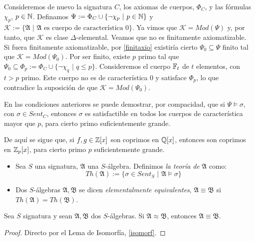 \begin{example}
Consideremos de nuevo la signatura $C$, los axiomas de cuerpos, $\Phi_C$, y las fórmulas $\chi_p$, $p \in \mathbb{N}$. Definamos $\Psi := \Phi_C \cup \{\neg\chi_p \, \, | \, \, p\in \mathbb{N} \}$ y $\mathcal{K} :=\{\mathfrak{A} \, \, | \, \, \mathfrak{A} \text{ es cuerpo de característica 0}\}$. Ya vimos que $\mathcal{K} = Mod(\Psi)$ y, por tanto, que $\mathcal{K}$ es clase $\Delta$-elemental. Veamos que no es finitamente axiomatizable.\\

Si fuera finitamente axiomatizable, por \ref{finitaxio} existiría cierto $\Psi_0 \subseteq \Psi$ finito tal que $\mathcal{K} = Mod(\Psi_0)$. Por ser finito, existe $p$ primo tal que $\Psi_0 \subseteq \Phi_p := \Phi_C \cup \{\neg\chi_q \, \, | \, \, q \leq p \}$. Consideremos el cuerpo $\mathbb{F}_t$ de $t$ elementos, con $t > p$ primo. Este cuerpo no es de característica 0 y satisface $\Phi_p$, lo que contradice la suposición de que $\mathcal{K} = Mod(\Psi_0)$.
\end{example}


\begin{example}
En las condiciones anteriores se puede demostrar, por compacidad, que si $\Psi \vDash \sigma$, con $\sigma \in Sent_C$, entonces $\sigma$ es satisfactible en todos los cuerpos de característica mayor que $p$, para cierto primo suficientemente grande.

De aquí se sigue que, si $f, g \in \mathbb{Z}[x]$ son coprimos en $\mathbb{Q}[x]$, entonces son coprimos en $\mathbb{Z}_p[x]$, para cierto primo $p$ suficientemente grande.
\end{example}

\begin{defs}
\begin{itemize}\mbox{}
    \item Sea $S$ una signatura, $\mathfrak{A}$ una $S$-álgebra. Definimos \textit{la teoría de} $\mathfrak{A}$ como:
$$Th(\mathfrak{A}) := \{\sigma \in Sent_S \, \, | \, \, \mathfrak{A}\vDash \sigma\}$$
    \item Dos $S$-álgebras $\mathfrak{A}, \mathfrak{B}$ se dicen \textit{elementalmente equivalentes}, $\mathfrak{A} \equiv \mathfrak{B}$ si $Th(\mathfrak{A}) = Th(\mathfrak{B})$.
\end{itemize}
\end{defs}

\begin{prop}\label{equiso}
Sea $S$ signatura y sean $\mathfrak{A}, \mathfrak{B}$ dos $S$-álgebras. Si $\mathfrak{A} \approx \mathfrak{B}$, entonces $\mathfrak{A} \equiv \mathfrak{B}$.
\end{prop}
\begin{proof}
Directo por el Lema de Isomorfía, \ref{isomorf}.
\end{proof}

